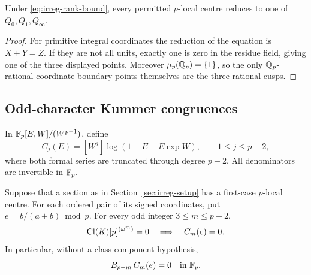 \begin{corollary}\label{cor:irreg-residue}
Under \eqref{eq:irreg-rank-bound}, every permitted \(p\)-local
centre reduces to one of \(Q_0,Q_1,Q_\infty\).
\end{corollary}

\begin{proof}
For primitive integral coordinates the reduction of the equation is
\(X+Y=Z\). If they are not all units, exactly one is zero in the
residue field, giving one of the three displayed points. Moreover
\(\mu_p(\mathbb Q_p)=\{1\}\), so the only \(\mathbb Q_p\)-rational coordinate
boundary points themselves are the three rational cusps.
\end{proof}

\subsection{Odd-character Kummer congruences}
\label{sec:irreg-character}

In \(\mathbb F_p[E,W]/(W^{p-1})\), define
\begin{equation}
 C_j(E)=[W^j]\log(1-E+E\exp W),
 \qquad 1\leq j\leq p-2,
 \label{eq:irreg-C}
\end{equation}
where both formal series are truncated through degree \(p-2\).
All denominators are invertible in \(\mathbb F_p\).

\begin{theorem}\label{thm:irreg-characters}
Suppose that a section as in Section~\ref{sec:irreg-setup} has a
first-case \(p\)-local centre. For each ordered pair of its signed
coordinates, put \(e=b/(a+b)\bmod p\). For every odd integer
\(3\leq m\leq p-2\),
\begin{equation}
 \operatorname{Cl}(K)[p]^{(\omega^m)}=0
       \quad\Longrightarrow\quad C_m(e)=0.
 \label{eq:irreg-character-zero}
\end{equation}
In particular, without a class-component hypothesis,
\begin{equation}
 B_{p-m}\,C_m(e)=0\quad\text{in }\mathbb F_p.
 \label{eq:irreg-Bernoulli-congruence}
\end{equation}
\end{theorem}

